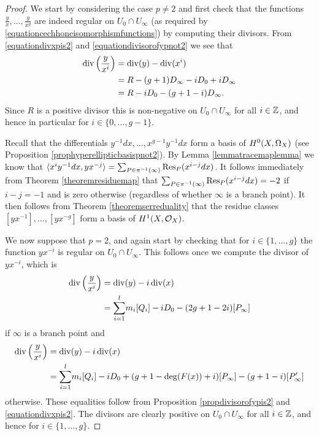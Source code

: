    \begin{proof}
    We start by considering the case $p \neq 2$ and first check that the functions $\frac{y}{x}, \ldots, \frac{y}{x^g}$ are indeed regular on $U_0 \cap U_\infty$ (as required by \eqref{equationcechhoneisomorphismfunctions}) by computing their divisors.
    From \eqref{equationdivxpis2} and \eqref{equationdivisorofypnot2} we see that
        \begin{equation*}\label{equationdivisorofyoverx}
        \begin{split}
        \operatorname{div} \left( \frac{y}{x^i} \right) & = \operatorname{div} (y) - \operatorname{div} ( x^i) \\
        & = R - (g+1)D_\infty - iD_0 + iD_\infty \\
        & = R - iD_0 - (g+1 - i)D_\infty.
        \end{split}
        \end{equation*}
    Since $R$ is a positive divisor this is non-negative on $U_0 \cap U_\infty$ for all $i \in {\mathbb Z}$, and hence in particular for $i\in \{0, \ldots, g-1\}$.
    
    
    Recall that the differentials $ y^{-1}dx, \ldots,  x^{g-1}y^{-1}dx$ form a basis of ${H^0(X,\Omega_X)}$ (see Proposition \ref{prophyperellipticbasispnot2}).
    By Lemma \ref{lemmatracemaplemma} we know that $\langle x^iy^{-1}dx, yx^{-j} \rangle = \sum_{P \in \pi^{-1}(\infty)}\operatorname{Res}_P(x^{i-j}dx)$.
    It follows immediately from Theorem \ref{theoremresiduemap} that $\sum_{P \in \pi^{-1}(\infty)}\operatorname{Res}_P(x^{i-j}dx) = -2$ if $i-j=-1$ and is zero otherwise (regardless of whether $\infty$ is a branch point).
    It then follows from Theorem \ref{theoremserreduality} that the residue classes $\left[yx^{-1}\right],\ldots,\left[yx^{-g}\right]$ form a basis of $H^1(X,\mathcal{O}_X)$.
    
    We now suppose that $p=2$, and again start by checking that for $i \in \{1, \ldots , g\}$ the function $yx^{-i}$ is regular on $U_0 \cap U_\infty$.
    This follows once we compute the divisor of $yx^{-i}$, which is
        \begin{align*}
        \operatorname{div} \left( \frac{y}{x^i} \right)  & =  \operatorname{div}(y) - i\operatorname{div}(x) \\
        & = {\displaystyle \sum_{i=1}^l} m_i[Q_i] -iD_0 -(2g+1 - 2i)[P_\infty]
        \end{align*}
    if $\infty$ is a branch point and
        \begin{align*}
        \operatorname{div} \left( \frac{y}{x^i} \right)  & =  \operatorname{div}(y) - i\operatorname{div}(x) \\  
        & = {\displaystyle \sum_{i=1}^l} m_i[Q_i] - iD_0 +(g+1-\deg(F(x)) + i)[P_\infty] - (g+1-i)[P_\infty']
        \end{align*}
    otherwise.
    These equalities follow from Proposition \ref{propdivisorofypis2} and \eqref{equationdivxpis2}.
    The divisors are clearly positive on $U_0 \cap U_\infty$ for all $i \in {\mathbb Z}$, and hence for $ i \in \{1, \ldots, g \}$.
    

\end{proof}
